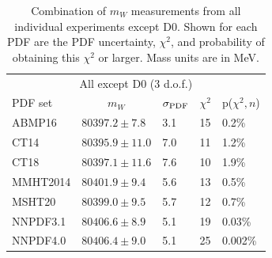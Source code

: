 \begin{table}[!tp]
  \centering
\begin{tabular}{lllll}
\hline \hline 
                                    \multicolumn{5}{c}{All except D0 (3 d.o.f.)} \\
PDF set                      & \multicolumn{1}{c}{$m_W$} & $\sigma_{\scriptsize\textrm{PDF}}$ & $\chi^2$ & p($\chi^2,n$)\\
\hline
                             ABMP16 & $80397.2 \pm  7.8$ &  3.1 &    15 & 0.2\% \\
                               CT14 & $80395.9 \pm 11.0$ &  7.0 &    11 & 1.2\% \\
                               CT18 & $80397.1 \pm 11.6$ &  7.6 &    10 & 1.9\% \\
                           MMHT2014 & $80401.9 \pm  9.4$ &  5.6 &    13 & 0.5\% \\
                             MSHT20 & $80399.0 \pm  9.5$ &  5.7 &    12 & 0.7\% \\
                           NNPDF3.1 & $80406.6 \pm  8.9$ &  5.1 &    19 & 0.03\% \\
                           NNPDF4.0 & $80406.4 \pm  9.0$ &  5.1 &    25 & 0.002\% \\
\hline \hline
\end{tabular}
\caption{Combination of $m_W$ measurements from all individual experiments except D0.
  Shown for each PDF are the PDF uncertainty, $\chi^2$, and probability of
  obtaining this $\chi^2$ or larger.  Mass units are in MeV.
  \label{tbl:all4_opt2}}
\end{table}
